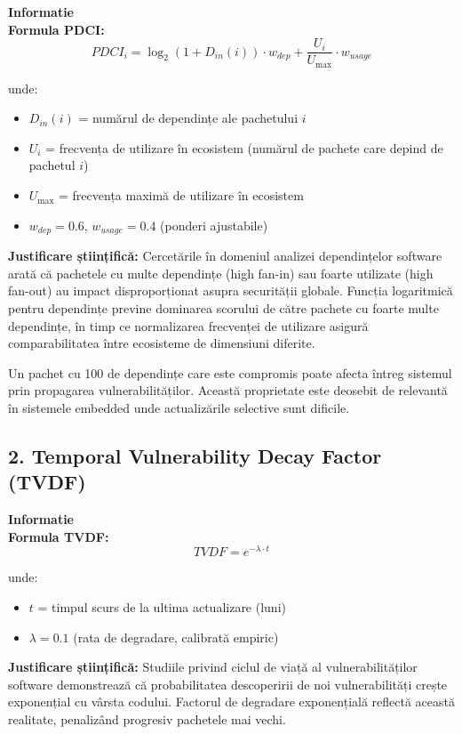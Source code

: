 \documentclass[12pt,a4paper]{article}
\newenvironment{infobox}{%
\begin{leftbar}
\color{black}
\textbf{Informatie}\\[0.5em]
}{%
\end{leftbar}
}
\begin{document}
\begin{infobox}
\textbf{Formula PDCI:}
\[PDCI_i = \log_2(1 + D_{in}(i)) \cdot w_{dep} + \frac{U_i}{U_{\max}} \cdot w_{usage}\]

unde:
\begin{itemize}
\item $D_{in}(i)$ = numărul de dependințe ale pachetului $i$
\item $U_i$ = frecvența de utilizare în ecosistem (numărul de pachete care depind de pachetul $i$)
\item $U_{\max}$ = frecvența maximă de utilizare în ecosistem
\item $w_{dep} = 0.6$, $w_{usage} = 0.4$ (ponderi ajustabile)
\end{itemize}
\end{infobox}

\textbf{Justificare științifică:} Cercetările în domeniul analizei dependințelor software arată că pachetele cu multe dependințe (high fan-in) sau foarte utilizate (high fan-out) au impact disproporționat asupra securității globale. Funcția logaritmică pentru dependințe previne dominarea scorului de către pachete cu foarte multe dependințe, în timp ce normalizarea frecvenței de utilizare asigură comparabilitatea între ecosisteme de dimensiuni diferite.

Un pachet cu 100 de dependințe care este compromis poate afecta întreg sistemul prin propagarea vulnerabilităților. Această proprietate este deosebit de relevantă în sistemele embedded unde actualizările selective sunt dificile.

\subsection{2. Temporal Vulnerability Decay Factor (TVDF)}

\begin{infobox}
\textbf{Formula TVDF:}
\[TVDF = e^{-\lambda \cdot t}\]

unde:
\begin{itemize}
\item $t$ = timpul scurs de la ultima actualizare (luni)
\item $\lambda = 0.1$ (rata de degradare, calibrată empiric)
\end{itemize}
\end{infobox}

\textbf{Justificare științifică:} Studiile privind ciclul de viață al vulnerabilităților software demonstrează că probabilitatea descoperirii de noi vulnerabilități crește exponențial cu vârsta codului. Factorul de degradare exponențială reflectă această realitate, penalizând progresiv pachetele mai vechi.
\end{document}
